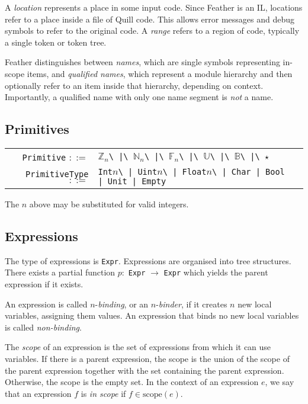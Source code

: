 \documentclass[UKenglish, 11pt, a4paper, parskip=half]{scrbook}
\newcommand{\inlinecode}[1]{\lstinline{#1}}
\begin{document}
A \textit{location} represents a place in some input code.
Since Feather is an IL, locations refer to a place inside a file of Quill code.
This allows error messages and debug symbols to refer to the original code.
A \textit{range} refers to a region of code, typically a single token or token tree.

Feather distinguishes between \textit{names}, which are single symbols representing in-scope items, and \textit{qualified names}, which represent a module hierarchy and then optionally refer to an item inside that hierarchy, depending on context.
Importantly, a qualified name with only one name segment is \textit{not} a name.

\subsection{Primitives}

\begin{tabular}{r l p{7cm}}
    \inlinecode{Primitive} \( ::= \) & \( \mathbb Z_{n} \)\inlinecode{\ |\ }\( \mathbb N_{n} \)\inlinecode{\ |\ }\( \mathbb F_{n} \)\inlinecode{\ |\ }\( \mathbb U \)\inlinecode{\ |\ }\( \mathbb B \)\inlinecode{\ |\ }\( \star \) \\
    \inlinecode{PrimitiveType} \( ::= \) & \inlinecode{Int}\( n \)\inlinecode{\ | Uint}\( n \)\inlinecode{\ | Float}\( n \)\inlinecode{\ | Char | Bool | Unit | Empty}
\end{tabular}

The \( n \) above may be substituted for valid integers.

\subsection{Expressions}

The type of expressions is \inlinecode{Expr}.
Expressions are organised into tree structures.
There exists a partial function \( p : \) \inlinecode{Expr} \( \to \) \inlinecode{Expr} which yields the parent expression if it exists.

\begin{defn}
    An expression is called \( n \)-\textit{binding}, or an \( n \)-\textit{binder}, if it creates \( n \) new local variables, assigning them values.
    An expression that binds no new local variables is called \textit{non-binding}.
\end{defn}

\begin{defn}
    The \textit{scope} of an expression is the set of expressions from which it can use variables.
    If there is a parent expression, the scope is the union of the scope of the parent expression together with the set containing the parent expression.
    Otherwise, the scope is the empty set.
    In the context of an expression \( e \), we say that an expression \( f \) is \textit{in scope} if \( f \in \mathrm{scope}(e) \).
\end{defn}
\end{document}
